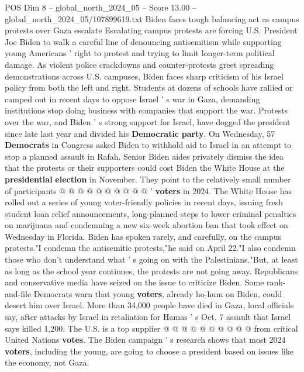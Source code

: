\begin{textsample}{POS Dim 8 – global\_north\_2024\_05 – Score 13.00 – global\_north\_2024\_05/107899619.txt}  \label{ex:f8_pos_072}
Biden faces tough balancing act as campus protests over Gaza escalate Escalating campus protests are forcing U.S.
President Joe Biden to walk a careful line of denouncing antisemitism while supporting young Americans ' right to protest and trying to limit longer-term political damage.
As violent police crackdowns and counter-protests greet spreading demonstrations across U.S. campuses, Biden faces sharp criticism of his Israel policy from both the left and right.
Students at dozens of schools have rallied or camped out in recent days to oppose Israel ' s war in Gaza, demanding institutions stop doing business with companies that support the war.
Protests over the war, and Biden ' s strong support for Israel, have dogged the president since late last year and divided his \textbf{Democratic} \textbf{party}.
On Wednesday, 57 \textbf{Democrats} in Congress asked Biden to withhold aid to Israel in an attempt to stop a planned assault in Rafah.
Senior Biden aides privately dismiss the idea that the protests or their supporters could cost Biden the White House at the \textbf{presidential} \textbf{election} in November.
They point to the relatively small number of participants @ @ @ @ @ @ @ @ @ @ ' \textbf{voters} in 2024.
The White House has rolled out a series of young voter-friendly policies in recent days, issuing fresh student loan relief announcements, long-planned steps to lower criminal penalties on marijuana and condemning a new six-week abortion ban that took effect on Wednesday in Florida.
Biden has spoken rarely, and carefully, on the campus protests."I condemn the antisemitic protests,"he said on April 22."I also condemn those who don't understand what ' s going on with the Palestinians."But, at least as long as the school year continues, the protests are not going away.
Republicans and conservative media have seized on the issue to criticize Biden.
Some rank-and-file Democrats warn that young \textbf{voters}, already ho-hum on Biden, could desert him over Israel.
More than 34,000 people have died in Gaza, local officials say, after attacks by Israel in retaliation for Hamas ' s Oct. 7 assault that Israel says killed 1,200.
The U.S. is a top supplier @ @ @ @ @ @ @ @ @ @ from critical United Nations \textbf{votes}.
The Biden campaign ' s research shows that most 2024 \textbf{voters}, including the young, are going to choose a president based on issues like the economy, not Gaza.

\end{textsample}

